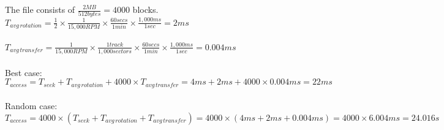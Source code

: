 \documentclass{article}
\begin{document}
The file consists of $\frac{2MB}{512bytes} = 4000$ blocks. \\
$T_{avg\,rotation} = \frac{1}{2} \times \frac{1}{15,000RPM} \times
\frac{60secs}{1min} \times \frac{1,000ms}{1sec} = 2ms$ \\
\\
$T_{avg\,transfer} = \frac{1}{15,000RPM} \times \frac{1track}{1,000sectors} \times 
\frac{60secs}{1min} \times \frac{1,000ms}{1sec} = 0.004ms$ \\
\\
Best case: \\
$T_{access} = T_{seek} + T_{avg\,rotation} + 4000 \times T_{avg\,transfer} = 
4ms + 2ms + 4000 \times 0.004ms = 22ms$ \\
\\
Random case: \\
$T_{access} = 4000 \times (T_{seek} + T_{avg\,rotation} + T_{avg\,transfer}) =
4000 \times (4ms + 2ms + 0.004ms) = 4000 \times 6.004ms = 24.016s$ \\
\end{document}
